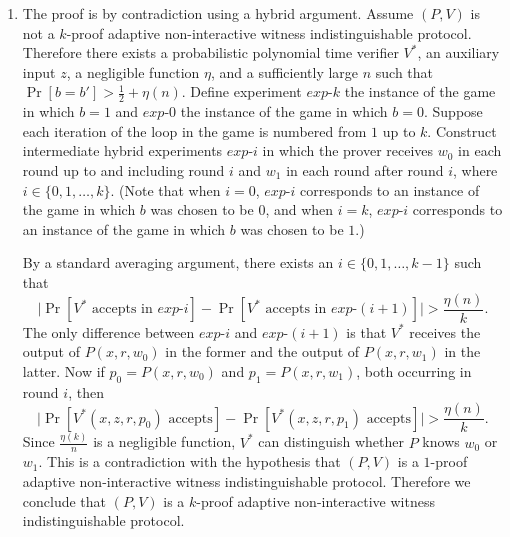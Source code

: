 \documentclass[draft]{article}
\begin{document}
\begin{enumerate}
\begin{enumerate}
  \item I don't know.
  \end{enumerate}
\item
  The proof is by contradiction using a hybrid argument.
  Assume $(P, V)$ is not a $k$-proof adaptive non-interactive witness indistinguishable protocol.
  Therefore there exists a probabilistic polynomial time verifier $V^*$, an auxiliary input $z$, a negligible function $\eta$, and a sufficiently large $n$ such that $\Pr[b=b'] > \frac{1}{2} + \eta(n)$.
  Define experiment $exp\mbox{-}k$ the instance of the game in which $b=1$ and $exp\mbox{-}0$ the instance of the game in which $b=0$.
  Suppose each iteration of the loop in the game is numbered from $1$ up to $k$.
  Construct intermediate hybrid experiments $exp\mbox{-}i$ in which the prover receives $w_0$ in each round up to and including round $i$ and $w_1$ in each round after round $i$, where $i\in\{0, 1, \ldots, k\}$.
  (Note that when $i=0$, $exp\mbox{-}i$ corresponds to an instance of the game in which $b$ was chosen to be $0$, and when $i=k$, $exp\mbox{-}i$ corresponds to an instance of the game in which $b$ was chosen to be $1$.)

  By a standard averaging argument, there exists an $i\in\{0,1,\ldots, k-1\}$ such that
  \begin{displaymath}
    \big|\Pr\left[V^*\text{ accepts in } exp\mbox{-}i\right] - \Pr\left[V^*\text{ accepts in } exp\mbox{-}(i+1)\right]\big| > \frac{\eta(n)}{k}.
  \end{displaymath}
  The only difference between $exp\mbox{-}i$ and $exp\mbox{-}(i+1)$ is that $V^*$ receives the output of $P(x, r, w_0)$ in the former and the output of $P(x, r, w_1)$ in the latter.
  Now if $p_0=P(x, r, w_0)$ and $p_1=P(x, r, w_1)$, both occurring in round $i$, then
  \begin{displaymath}
    \big|\Pr\left[V^*(x, z, r, p_0)\text{ accepts}\right] - \Pr\left[V^*(x, z, r, p_1)\text{ accepts}\right]\big| > \frac{\eta(n)}{k}.
  \end{displaymath}
  Since $\frac{\eta(k)}{n}$ is a negligible function, $V^*$ can distinguish whether $P$ knows $w_0$ or $w_1$.
  This is a contradiction with the hypothesis that $(P, V)$ is a $1$-proof adaptive non-interactive witness indistinguishable protocol.
  Therefore we conclude that $(P, V)$ is a $k$-proof adaptive non-interactive witness indistinguishable protocol.
\end{enumerate}
\end{document}
